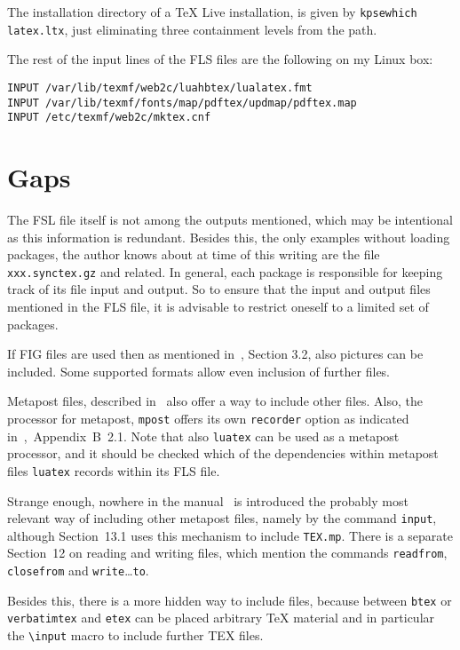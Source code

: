 \documentclass[a4paper, english]{article}%
\begin{document}
The installation directory of a \TeX{} Live installation, 
is given by \texttt{kpsewhich latex.ltx}, 
just eliminating three containment levels from the path. 

The rest of the input lines of the FLS files are the following on my Linux box: 
%
\begin{verbatim}
INPUT /var/lib/texmf/web2c/luahbtex/lualatex.fmt
INPUT /var/lib/texmf/fonts/map/pdftex/updmap/pdftex.map
INPUT /etc/texmf/web2c/mktex.cnf
\end{verbatim}

\section{Gaps}\label{sec:gaps}

The FSL file itself is not among the outputs mentioned, 
which may be intentional as this information is redundant. 
Besides this, the only examples without loading packages, 
the author knows about at time of this writing 
are the file \texttt{xxx.synctex.gz} and related. 
In general, each package is responsible for keeping track of its file input and output. 
So to ensure that the input and output files mentioned in the FLS file, 
it is advisable to restrict oneself to a limited set of packages. 

If FIG files are used then as mentioned in~\cite{XFigF}, Section 3.2, 
also pictures can be included. 
Some supported formats allow even inclusion of further files. 

Metapost files, described in~\cite{MPost24} also offer a way to include other files. 
Also, the processor for metapost, \texttt{mpost} offers its own \texttt{recorder} option 
as indicated in~\cite{MPost24},~Appendix~B~2.1. 
Note that also \texttt{luatex} can be used as a metapost processor, 
and it should be checked which of the dependencies within metapost files 
\texttt{luatex} records within its FLS file. 

Strange enough, nowhere in the manual~\cite{MPost24} 
is introduced the probably most relevant way of including other metapost files, 
namely by the command \texttt{input}, 
although Section~13.1 uses this mechanism to include \texttt{TEX.mp}. 
There is a separate Section~12 on reading and writing files, 
which mention the commands \texttt{readfrom}, \texttt{closefrom} 
and \texttt{write}\dots\texttt{to}. 

Besides this, there is a more hidden way to include files, 
because between \texttt{btex} or \texttt{verbatimtex} and \texttt{etex} 
can be placed arbitrary \TeX{} material 
and in particular the \texttt{\textbackslash{}input} macro to include further TEX files. 
\end{document}
